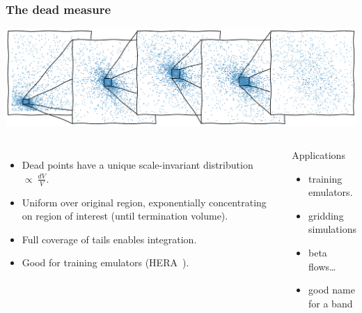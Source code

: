 \documentclass[aspectratio=169]{beamer}
\begin{document}
\begin{frame}
    \frametitle{The dead measure~}
    \includegraphics[width=\textwidth]{figures/dead_measure}
    \begin{columns}
        \begin{itemize}
            \item Dead points have a unique scale-invariant distribution $\propto\: \tfrac{dV}{V}$.
            \item Uniform over original region, exponentially concentrating on region of interest (until termination volume).
            \item Full coverage of tails enables integration.
            \item Good for training emulators (HERA~).
        \end{itemize}
        \begin{block}{Applications}
        \begin{itemize}
            \item training emulators.
            \item gridding simulations
            \item beta flows\ldots
            \item good name for a band
        \end{itemize}
        \end{block}
    \end{columns}
\end{frame}
\end{document}
